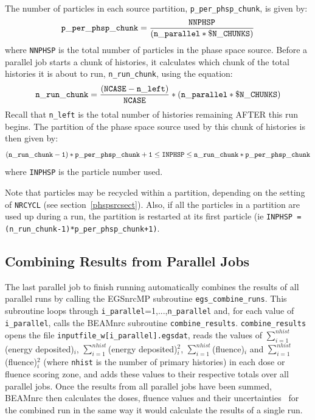 \documentclass[12pt,twoside]{article}
\begin{document}
The number of particles
in each source partition, {\tt p\_per\_phsp\_chunk}, is
given by:
\begin{equation}
{\tt p\_per\_phsp\_chunk} = \frac{{\tt NNPHSP}}{\left({\tt
                 n\_parallel*\$N\_CHUNKS}\right)}
\end{equation}
where {\tt NNPHSP} is the total number of particles in the phase space
source.  Before a parallel job starts a chunk of histories, it calculates
which chunk of the total histories it is about to run,
{\tt n\_run\_chunk}, using the equation:
\begin{equation}
{\tt n\_run\_chunk} = \frac{\left({\tt
NCASE-n\_left}\right)}{{\tt NCASE}}*\left({\tt
n\_parallel*\$N\_CHUNKS}\right)
\end{equation}
Recall that {\tt n\_left} is the total number of histories remaining AFTER
this run begins.  The partition of the phase space source used by this
chunk of histories is then given by:
\begin{equation}
\left({\tt n\_run\_chunk-1}\right)*{\tt p\_per\_phsp\_chunk+1}
\leq {\tt INPHSP} \leq {\tt n\_run\_chunk*p\_per\_phsp\_chunk}
\end{equation}
where {\tt INPHSP} is the particle number used.

Note that particles may be recycled within a partition, depending on
the setting of {\tt NRCYCL} (see section~\ref{phspsrcsect}).  Also, if
all the particles in a partition are used up during a run, the partition
is restarted at its first particle
(ie {\tt INPHSP = (n\_run\_chunk-1)*p\_per\_phsp\_chunk+1)}.

\subsection{Combining Results from Parallel Jobs}
\label{recombinesect}

The last parallel job to finish running automatically combines
the results of all parallel runs by calling the EGSnrcMP subroutine
{\tt egs\_combine\_runs}.  This subroutine loops through
{\tt i\_parallel}=1,...,{\tt n\_parallel} and, for each value
of {\tt i\_parallel}, calls the BEAMnrc subroutine {\tt combine\_results}.
{\tt combine\_results}
opens the file {\tt inputfile\_w[i\_parallel].egsdat},
reads the values of
$\sum_{i=1}^{nhist}$(energy deposited)$_i$,
$\sum_{i=1}^{nhist}$(energy deposited)$^2_i$,
$\sum_{i=1}^{nhist}$(fluence)$_i$ and
$\sum_{i=1}^{nhist}$(fluence)$^2_i$ (where
{\tt nhist} is the number of primary histories) in each dose or
fluence scoring zone, and adds these values to their respective totals
over all parallel jobs.
Once the results from all parallel jobs have been summed, BEAMnrc
then calculates the doses, fluence values and their uncertainties~\cite{Wa02a}
for the combined run in the same way it would calculate the results
of a single run.
\end{document}
